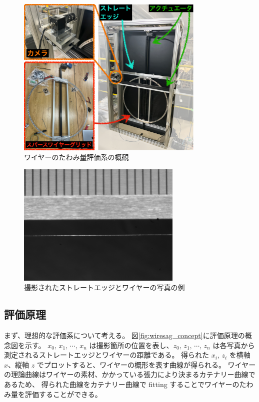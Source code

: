\documentclass[../../main.tex]{subfiles}
\begin{document}
\begin{figure}[H]
    \centering
    \includegraphics[width=0.8\textwidth]{wiresag/wiresag_system.pdf}
    \caption{ワイヤーのたわみ量評価系の概観}
    \label{fig:wiresag_system}
\end{figure}

\begin{figure}[H]
    \centering
    \includegraphics[width=0.7\textwidth]{wiresag/20241217_UHF_3_wire2_x467_gray.png}
    \caption{撮影されたストレートエッジとワイヤーの写真の例}
    \label{fig:wiresag_picture}    
\end{figure}

\subsection{評価原理}
\label{subsec:wiresag_principle}
まず、理想的な評価系について考える。
図\ref{fig:wiresag_concept}に評価原理の概念図を示す。
$x_{0},\,x_{1},\,\cdots,\,x_{n}$ は撮影箇所の位置を表し、$z_{0},\,z_{1},\,\cdots,\,z_{n}$ は各写真から測定されるストレートエッジとワイヤーの距離である。
得られた $x_{i},\,z_{i}$ を横軸 $x$、縦軸 $z$ でプロットすると、ワイヤーの概形を表す曲線が得られる。
ワイヤーの理論曲線はワイヤーの素材、かかっている張力により決まるカテナリー曲線であるため、
得られた曲線をカテナリー曲線で fitting することでワイヤーのたわみ量を評価することができる。
\end{document}
